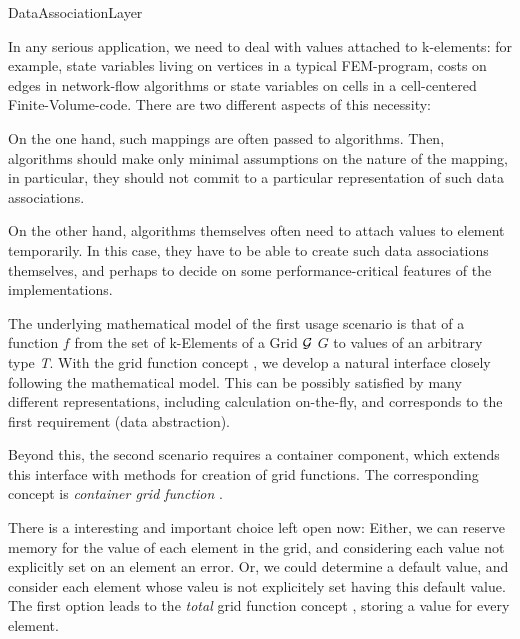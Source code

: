 
\begin{Label}{DataAssociationLayer}
\end{Label}

      In any serious application, we need to deal with values attached to k-elements:
      for example, state variables living on vertices in a typical FEM-program,
      costs on edges in network-flow algorithms or state variables on cells
      in a cell-centered Finite-Volume-code.
      There are two different aspects of this necessity:
      
      On the one hand, such mappings are often passed to algorithms.
      Then, algorithms should make only minimal assumptions on the nature 
      of the mapping, in particular, they should not commit to a particular representation
      of such data associations.

      On the other hand, algorithms themselves often need to attach values to
      element temporarily. In this case, they have to be able to create such data
      associations themselves, and perhaps to decide on some performance-critical
      features of the implementations.
      
      The underlying mathematical model of the first usage scenario 
      is that of a function $f$ from the set 
      of k-Elements of a Grid \T${\cal G}$ \W$G$ to values of an arbitrary type {\em T\/}.
      With the grid function concept ,
      we develop a natural interface
      closely following the  mathematical model.
      This can be possibly satisfied by many different representations,
      including calculation on-the-fly, and corresponds to the first
      requirement (data abstraction).
      
      Beyond this, the second scenario requires a  container component,
      which extends this interface with
      methods for creation of grid functions. 
      The corresponding concept 
      is {\em container grid function\/}  .

      There is a interesting and important choice left open now:
      Either, we can reserve memory for the value of each element in the grid,
      and considering each value not explicitly set on an element an error.
      Or, we could determine a default value, and consider each element whose
      valeu is not explicitely set having this default value.
      The first option leads to the {\em total\/} grid function concept
      ,
      storing a value for every element.
      
